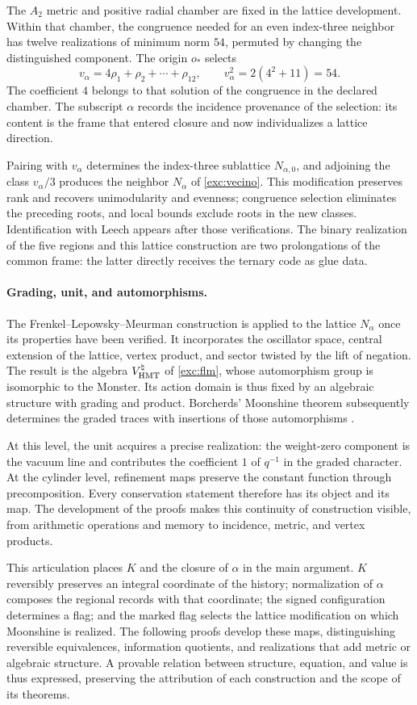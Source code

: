 The $A_2$ metric and positive radial chamber are fixed in the lattice
development. Within that chamber, the congruence needed for an
even index-three neighbor has twelve realizations of minimum norm $54$,
permuted by changing the distinguished component. The origin $o_*$
selects
\[
 v_\alpha=4\rho_1+\rho_2+\cdots+\rho_{12},\qquad
 v_\alpha^2=2(4^2+11)=54.
\]
The coefficient $4$ belongs to that solution of the congruence in the
declared chamber. The subscript $\alpha$ records the incidence
provenance of the selection: its content is the frame that entered
closure and now individualizes a lattice direction.

Pairing with $v_\alpha$ determines the index-three sublattice
$N_{\alpha,0}$, and adjoining the class
$v_\alpha/3$ produces the neighbor $N_\alpha$ of
\eqref{exc:vecino}. This modification preserves rank and recovers
unimodularity and evenness; congruence selection eliminates the preceding
roots, and local bounds exclude roots in the new classes.
Identification with Leech appears after those verifications. The
binary realization of the five regions and this lattice construction
are two prolongations of the common frame: the latter directly receives
the ternary code as glue data.

\paragraph{Grading, unit, and automorphisms.}
\label{inc-ampl-automorfismos}
The Frenkel--Lepowsky--Meurman construction is applied to the lattice
$N_\alpha$ once its properties have been verified. It incorporates the oscillator
space, central extension of the lattice, vertex product,
and sector twisted by the lift of negation. The result is
the algebra $V^\natural_{\rm HMT}$ of \eqref{exc:flm}, whose automorphism
group is isomorphic to the Monster. Its action domain is thus
fixed by an algebraic structure with grading and product. Borcherds'
Moonshine theorem subsequently determines the graded traces
with insertions of those automorphisms \cite{flm,borcherds}.

At this level, the unit acquires a precise realization: the
weight-zero component is the vacuum line and contributes the coefficient $1$ of
$q^{-1}$ in the graded character. At the cylinder level,
refinement maps preserve the constant function through
precomposition. Every conservation statement therefore has its
object and its map. The development of the proofs makes this
continuity of construction visible, from arithmetic operations and
memory to incidence, metric, and vertex products.

This articulation places $K$ and the closure of $\alpha$ in the main
argument. $K$ reversibly preserves an integral coordinate of the
history; normalization of $\alpha$ composes the regional records
with that coordinate; the signed configuration determines a flag; and
the marked flag selects the lattice modification on which
Moonshine is realized. The following proofs develop these
maps, distinguishing reversible equivalences, information
quotients, and realizations that add metric or algebraic
structure. A provable relation between structure,
equation, and value is thus expressed, preserving the attribution of each construction
and the scope of its theorems.
